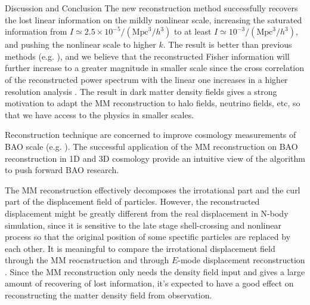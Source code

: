 \begin{section}{Discussion and Conclusion}
 \label{sec:conclusion}
The new reconstruction method successfully recovers the lost linear 
information on the mildly nonlinear scale, increasing the saturated 
information from $I \simeq 2.5 \times 10^{-5}/(\mathrm{Mpc}^3/h^3)$ 
to at least $I \simeq 10^{-3}/(\mathrm{Mpc}^3/h^3)$, and pushing the 
nonlinear scale to higher $k$. 
The result is better than previous methods 
(e.g. \cite{bib:Mark2006,bib:Mark2009,bib:Zhang2011,bib:Yu2012}), 
and we believe that the reconstructed Fisher information will further 
increase to a greater magnitude in smaller scale since the cross 
correlation of the reconstructed power spectrum with the linear one 
increases in a higher resolution analysis \cite{bib:ZhuH2016}.
The result in dark matter density fields gives a strong motivation to 
adapt the MM reconstruction to halo fields, neutrino fields, etc, so 
that we have access to the physics in smaller scales. 

Reconstruction technique are concerned to improve cosmology measurements 
of BAO scale (e.g. \cite{bib:Daniel2007,bib:Martin2015}). 
The successful application of the MM reconstruction on BAO reconstruction 
in 1D \cite{bib:Zhu2016} and 3D \cite{bib:ZhuH2016} cosmology provide 
an intuitive view of the algorithm to push forward BAO research.

The MM reconstruction effectively decomposes the irrotational part and 
the curl part of the displacement field of particles. However, the 
reconstructed displacement might be greatly different from the real 
displacement in N-body simulation, since it is sensitive to the late 
stage shell-crossing and nonlinear process so that the original position 
of some spectific particles are replaced by each other. 
It is meaningful to compare the irrotational displacement field through 
the MM reocnstruction and through $E$-mode displacement reconstruction 
\cite{bib:Yu2016}.  
Since the MM reconstruction only needs the density field input and gives 
a large amount of recovering of lost information, it's expected to have 
a good effect on reconstructing the matter density field from observation.
\end{section}
